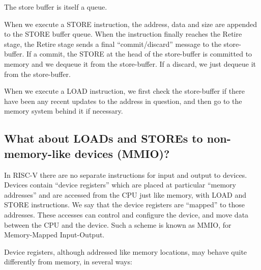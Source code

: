 \begin{tightlist}

 \item The store buffer is itself a queue.

 \item When we execute a STORE instruction, the address, data and size
       are appended to the STORE buffer queue.  When the instruction
       finally reaches the Retire stage, the Retire stage sends a
       final ``commit/discard'' message to the store-buffer.  If a
       commit, the STORE at the head of the store-buffer is committed
       to memory and we dequeue it from the store-buffer.  If a
       discard, we just dequeue it from the store-buffer.

 \item When we execute a LOAD instruction, we first check the
       store-buffer if there have been any recent updates to the
       address in question, and then go to the memory system behind it
       if necessary.

\end{tightlist}


\subsection{What about LOADs and STOREs to non-memory-like devices (MMIO)?}

\label{Sec_DMem_MMIO}


In RISC-V there are no separate instructions for input and output to
devices.  Devices contain ``device registers'' which are placed at
particular ``memory addresses'' and are accessed from the CPU just
like memory, with LOAD and STORE instructions.  We say that the device
registers are ``mapped'' to those addresses.  These accesses can
control and configure the device, and move data between the CPU and
the device.  Such a scheme is known as MMIO, for Memory-Mapped
Input-Output.

Device registers, although addressed like memory locations, may behave
quite differently from memory, in several ways:

